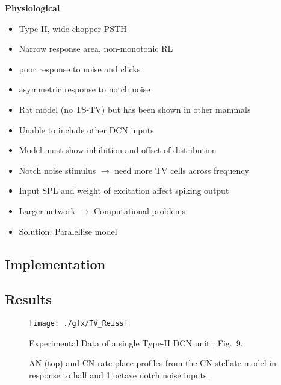 \textbf{Physiological}
\begin{itemize}
\item Type II, wide chopper PSTH
  \citep{Rhode:1999,SpirouDavisEtAl:1999}
\item Narrow response area, non-monotonic RL
\item poor response to noise and clicks
\item asymmetric response to notch noise \citep{ReissYoung:2005}
\end{itemize}


\begin{itemize}
\item Rat model (no TS-TV) but has been shown in other mammals
\item Unable to include other DCN inputs
\item Model must show \DSTV inhibition and offset of distribution


\item Notch noise stimulus $\rightarrow$ need more TV cells across
  frequency
\item Input SPL and weight of excitation affect spiking output
\item Larger network $\rightarrow$ Computational problems
\item Solution: Paralellise model
\end{itemize}


\subsection{Implementation}



\clearpage
\subsection{Results} 

\begin{figure}[htb]
  \centering
\texttt{[image: ./gfx/TV\_Reiss]}
\caption{Experimental Data of a single Type-II DCN unit \citep{ReissYoung:2005}, Fig.~9.}
  \label{fig:TVReissFig9}
\end{figure}


\begin{figure}[tbh]
  \centering
%
\caption{AN (top) and CN rate-place profiles from the CN stellate
  model in response to half and 1 octave notch noise inputs. }
\label{fig:TVResults}
\end{figure}



